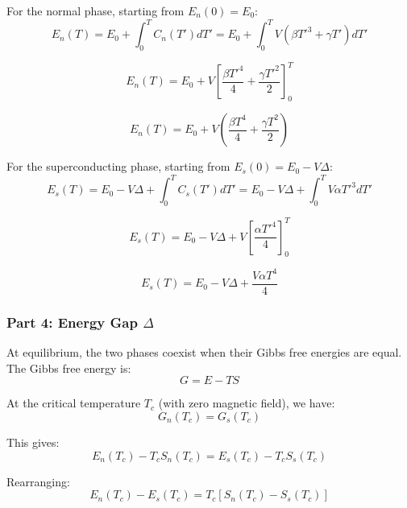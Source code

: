 \documentclass[10pt,twocoloumn]{article}
\begin{document}
For the normal phase, starting from $E_n(0) = E_0$:
\begin{equation}E_n(T) = E_0 + \int_0^T C_n(T')dT' = E_0 + \int_0^T V(\beta T'^3 + \gamma T')dT'\end{equation}

\begin{equation}E_n(T) = E_0 + V\left[\frac{\beta T'^4}{4} + \frac{\gamma T'^2}{2}\right]_0^T\end{equation}

\begin{equation}\boxed{E_n(T) = E_0 + V\left(\frac{\beta T^4}{4} + \frac{\gamma T^2}{2}\right)}\end{equation}

For the superconducting phase, starting from $E_s(0) = E_0 - V\Delta$:
\begin{equation}E_s(T) = E_0 - V\Delta + \int_0^T C_s(T')dT' = E_0 - V\Delta + \int_0^T V\alpha T'^3 dT'\end{equation}

\begin{equation}E_s(T) = E_0 - V\Delta + V\left[\frac{\alpha T'^4}{4}\right]_0^T\end{equation}

\begin{equation}\boxed{E_s(T) = E_0 - V\Delta + \frac{V\alpha T^4}{4}}\end{equation}

\subsubsection*{Part 4: Energy Gap $\Delta$}

At equilibrium, the two phases coexist when their Gibbs free energies are equal. The Gibbs free energy is:
\begin{equation}G = E - TS\end{equation}

At the critical temperature $T_c$ (with zero magnetic field), we have:
\begin{equation}G_n(T_c) = G_s(T_c)\end{equation}

This gives:
\begin{equation}E_n(T_c) - T_c S_n(T_c) = E_s(T_c) - T_c S_s(T_c)\end{equation}

Rearranging:
\begin{equation}E_n(T_c) - E_s(T_c) = T_c[S_n(T_c) - S_s(T_c)]\end{equation}
\end{document}
